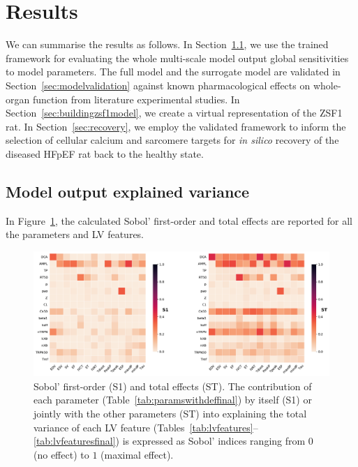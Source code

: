 \section{Results}\label{sec:results}
We can summarise the results as follows. In Section~\ref{sec:sobolgsa}, we use the trained framework for evaluating the whole multi-scale model output global sensitivities to model parameters. The full model and the surrogate model are validated in Section~\ref{sec:modelvalidation} against known pharmacological effects on whole-organ function from literature experimental studies. In Section~\ref{sec:buildingzsf1model}, we create a virtual representation of the ZSF1 rat. In Section~\ref{sec:recovery}, we employ the validated framework to inform the selection of cellular calcium and sarcomere targets for \textit{in silico} recovery of the diseased HFpEF rat back to the healthy state.


%
%
%
\subsection{Model output explained variance}\label{sec:sobolgsa}
In Figure~\ref{fig:s1stheat}, the calculated Sobol' first-order and total effects are reported for all the parameters and LV features.

\begin{figure}[!ht]
    \myfloatalign
    \includegraphics[width=\textwidth]{figures/chapter07/gsa_16p_heatmap_S1_ST.pdf}
    \caption{Sobol' first-order (S1) and total effects (ST). The contribution of each parameter (Table~\ref{tab:paramswithdeffinal}) by itself (S1) or jointly with the other parameters (ST) into explaining the total variance of each LV feature (Tables~\ref{tab:lvfeatures}--\ref{tab:lvfeaturesfinal}) is expressed as Sobol' indices ranging from $0$ (no effect) to $1$ (maximal effect).}
    \label{fig:s1stheat}
\end{figure}

